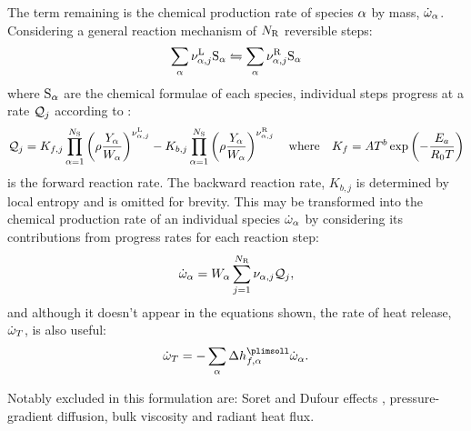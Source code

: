 The term remaining is the chemical production rate of species $\a$ by mass, $\dot{\w}_\a$. Considering a general reaction mechanism of $N_{\rm{R}}$ reversible steps:
\begin{equation}
\sum_\a \nu_{\a, j}^{\rm{L}} \rm{S}_\a \leftrightharpoons \sum_\a \nu_{\a, j}^{\rm{R}} \rm{S}_\a
\end{equation}
where $\rm{S}_\a$ are the chemical formulae of each species, individual steps progress at a rate $\cl{Q}_j$ according to \cite{poinsot2005TheoreticalNumericalCombustion}:
\begin{equation}
\cl{Q}_j = K_{f, j}\prod_{\a = 1}^{N_{\rm{S}}} \left(\r \frac{Y_\a}{W_\a}\right)^{\nu_{\a, j}^{\rm{L}}} - K_{b, j}\prod_{\a = 1}^{N_{\rm{S}}} \left(\r \frac{Y_\a}{W_\a}\right)^{\nu_{\a, j}^{\rm{R}}}
\quad \text{where} \quad
K_{f} = A T^b \exp\left(-\frac{E_a}{R_0 T}\right)
\end{equation}
is the forward reaction rate. The backward reaction rate, $K_{b, j}$ is determined by local entropy and is omitted for brevity. This may be transformed into the chemical production rate of an individual species $\dot{\w}_\a$ by considering its contributions from progress rates for each reaction step:
\begin{equation}
\dot{\w}_\a = W_\a \sum_{j = 1}^{N_\rm{R}} \nu_{\a, j} \cl{Q}_j,
\end{equation}
and although it doesn't appear in the equations shown, the rate of heat release, $\dot{\w}_T$, is also useful:
\begin{equation}
\dot{\w}_T = -\sum_\a \D h_{f, \a}^\plimsoll \dot{\w}_\a.
\end{equation}

Notably excluded in this formulation \cite{williams1985CombustionTheory} are: Soret and Dufour effects \cite{dufour1872DiffusionThermoeffect, mortimer1980ElementaryTransitionState, soret1879EtatEquilibreQue, kohler2016SoretEffectLiquid}, pressure-gradient diffusion, bulk viscosity \cite{buresti2015NoteStokesHypothesis} and radiant heat flux.





